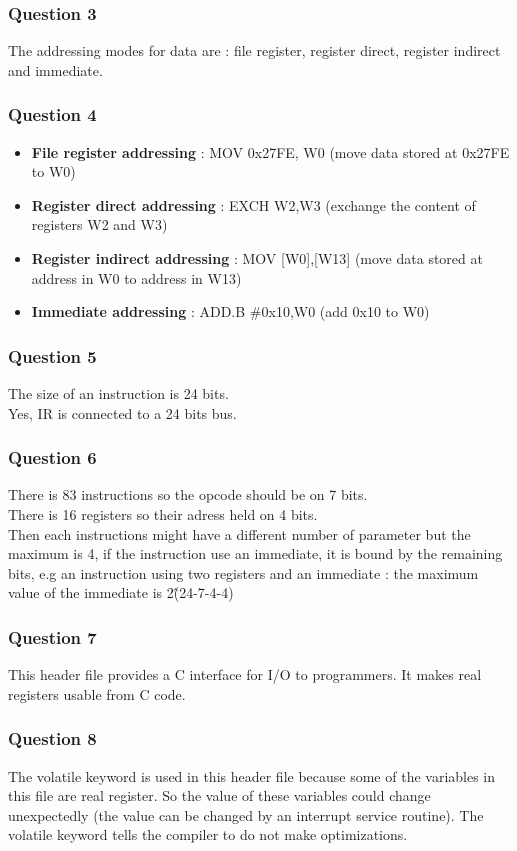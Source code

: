 \documentclass[a4paper,10pt]{article}
\begin{document}
\subsubsection*{Question 3}
The addressing modes for data are : file register, register direct, register indirect and immediate.

\subsubsection*{Question 4}
\begin{itemize}
\item \textbf{File register addressing} : MOV 0x27FE, W0 (move data stored at 0x27FE to W0)
\item \textbf{Register direct addressing} : EXCH W2,W3 (exchange the content of registers W2 and W3)
\item \textbf{Register indirect addressing} : MOV [W0],[W13] (move data stored at address in W0 to address in W13)
\item \textbf{Immediate addressing} : ADD.B $\#$0x10,W0 (add 0x10 to W0)
\end{itemize}

\subsubsection*{Question 5}
The size of an instruction is 24 bits.\\
Yes, IR is connected to a 24 bits bus.

\subsubsection*{Question 6}
There is 83 instructions so the opcode should be on 7 bits.\\
There is 16 registers so their adress held on 4 bits.\\
Then each instructions might have a different number of parameter but the maximum is 4, if the instruction use an immediate, it is bound by the remaining bits, e.g an instruction using two registers and an immediate : the maximum value of the immediate is 2\^(24-7-4-4)

\subsubsection*{Question 7}
This header file provides a C interface for I/O to programmers. It makes real registers usable from C code.

\subsubsection*{Question 8}
The volatile keyword is used in this header file because some of the variables in this file are real register. So the value of these variables could change unexpectedly (the value can be changed by an interrupt service routine). The volatile keyword tells the compiler to do not make optimizations.
\end{document}
